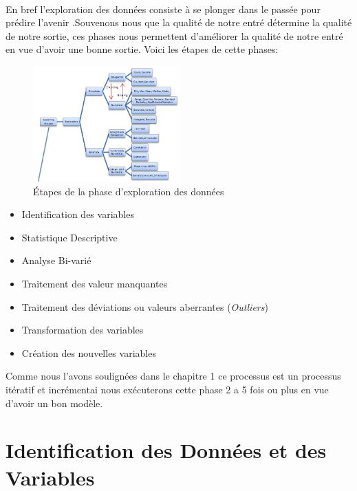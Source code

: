 \paragraph{}
En bref l'exploration des données consiste à se plonger dans le passée
pour prédire l'avenir .Souvenons nous que la qualité de notre entré
détermine la qualité de notre sortie, ces phases nous permettent
d'améliorer la qualité de notre entré en vue d'avoir une bonne sortie.
Voici les étapes de cette phases:
\begin{figure}[ht]
	\centering
	\includegraphics[width=0.5\textwidth]{fig/Exploration.png}
	\caption[Short caption]{Étapes de la phase d'exploration des données }
	\label{fig:imageExpSt}
\end{figure} 
\begin{itemize}
\item
  Identification des variables
\item
  Statistique Descriptive
\item
  Analyse Bi-varié
\item
  Traitement des valeur manquantes
\item
  Traitement des déviations  ou valeurs aberrantes (\emph{Outliers})  
\item
  Transformation des variables
\item
  Création des nouvelles variables
\end{itemize}
Comme nous l'avons soulignées dans le chapitre 1 ce processus est un
processus itératif et incrémentai nous exécuterons cette phase 2 a 5 fois ou plus en vue d'avoir un bon modèle.
\section{Identification des Données et des Variables}
